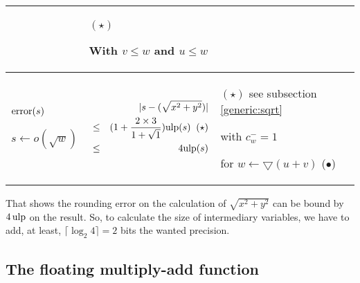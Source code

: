 \documentclass[12pt]{amsart}
\def\minf{\bigtriangledown}
\def\ulp{{\rm ulp}}
\begin{document}
\begin{center}
\begin{tabular}{l|l |l}
\begin{minipage}{7.8cm}
\end{minipage} &
\begin{minipage}{6cm}

$(\star)$

With $v \leq w$ and $u \leq w$

\end{minipage}\\\hline
\begin{minipage}{2.5cm}
${\textnormal{error}}(s)$

$s \leftarrow o(\sqrt{w}) $

\end{minipage} &
\begin{minipage}{7.5cm}

\begin{center}



\begin{eqnarray}\nonumber
  &&|s-(\sqrt{x^2+y^2})| \\\nonumber
  &\leq& (1+\frac{2 \times  3}{1+\sqrt{1}}) \ulp(s) \;\; (\star)\\\nonumber
   &\leq& 4 \ulp(s) 
\end{eqnarray}



\end{center}

\end{minipage} &
\begin{minipage}{6cm}

$(\star)$
see subsection \ref{generic:sqrt}


with $c_w^- = 1$ 

for $w \leftarrow \minf(u+v)$ ($\bullet$)

\end{minipage}


\end{tabular}
\end{center}



That shows the rounding error on the calculation of $\sqrt{x^2+y^2}$ can be
bound by $4 \, \ulp$ on the result. So, to calculate the size of
intermediary variables, we have to add, at least, $\lceil \log_2 4 \rceil=2$ bits the wanted precision.


\subsection{The floating multiply-add function}
\end{document}

